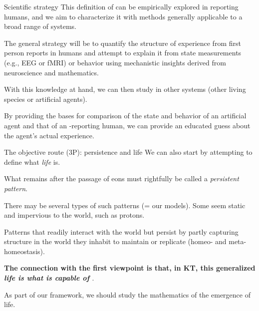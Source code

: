 \begin{frame}[label=intro3]{Scientific strategy}
This definition of \SEP can be empirically explored in reporting humans, and  we   aim to characterize it with methods generally applicable to a broad range of systems.  \vfill

  The general strategy will be  to quantify the structure of experience from first person reports in humans and attempt to explain it from state measurements (e.g., EEG or fMRI) or behavior using mechanistic insights derived from  neuroscience and mathematics.  \vfill
  
  With this knowledge at hand, we can then study \SEP in other systems (other living species or artificial agents). \vfill
  
  By providing  the bases for comparison  of the state and behavior of an artificial agent and that of an \SEP-reporting human, we can provide an educated guess about the agent’s actual experience.

\end{frame}


\begin{frame}[label=intro4]{The objective route (3P): persistence and life}
We can also start by attempting to define what {\em life} is.\vfill

What remains after the passage of eons must rightfully be called a {\em persistent pattern}.\vfill

There may be several types of such patterns (= our models). Some seem static and impervious to the world, such as protons.  \vfill

\begin{definition}[Life]
Patterns that readily interact  with the world but persist by partly capturing  structure in the world they inhabit to maintain or replicate  (homeo- and meta-homeostasis).  \end{definition}\vfill

 {\bf The connection with the first viewpoint is that, in KT, this {generalized \em life is what is capable of \SEP}}. \vfill 
 
 As part of our framework, we should study the mathematics of the emergence of life. 
\end{frame}




